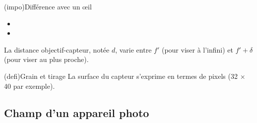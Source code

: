 \documentclass[../../main/main.tex]{subfiles}
\begin{document}
\begin{tcb*}[sidebyside, righthand ratio=.4]
\begin{center}
{		}%
	\end{center}
\end{tcb*}

\begin{tcb*}(impo){Différence avec un œil}
	\begin{itemize}
		\item
		\item
	\end{itemize}
	La distance objectif-capteur, notée $d$, varie entre $f'$ (pour viser à
	l'infini) et $f'+\delta$ (pour viser au plus proche).
\end{tcb*}

\begin{tcb*}[sidebyside](defi){Grain et tirage}
	\smallbreak
	La surface du capteur s'exprime en termes de pixels (32 $\times$ 40 par
	exemple).
	\tcblower
\end{tcb*}

\subsection{Champ d'un appareil photo}

\end{document}
